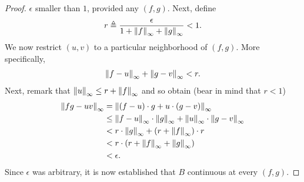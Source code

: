 \begin{proof}
$\epsilon $ smaller than $1$, provided any $(f, g)$. Next, define %
%
\begin{align}
  r \triangleq \frac{\epsilon}{1 + \norma{\infty}{f} + \norma{\infty}{g}} < 1. %
\end{align}
%
We now restrict $(u, v)$ to a particular neighborhood of $(f, g)$. %
More specifically,  
\begin{align}
  \norma{\infty}{f-u} + \norma{\infty}{g-v} < r. %
\end{align}
%
Next, remark that %
%
  $\norm{u}_{\infty} \leq r + \norm{f}_{\infty}$ %
%
and so obtain (bear in mind that $r < 1$)%
%
  \begin{align}
    \norm{fg - uv}_{\infty} 
      & =
    \norm{(f-u) \cdot g + u \cdot (g-v)}_{\infty} \\
      & \leq
    \norm{f-u}_{\infty} \cdot \norm{g}_{\infty} + 
    \norm{u}_{\infty}   \cdot \norm{g-v}_{\infty} \\
      & < r \cdot \norm{g}_{\infty} + (r + \norm{f}_{\infty}) \cdot r \\
      & < r \cdot (r + \norm{f}_{\infty} + \norm{g}_{\infty})  \\
      & < \epsilon.
  \end{align}
%
Since $\epsilon$ was arbitrary, it is now established that $B$ continuous %
at every $(f, g)$.
\end{proof}
